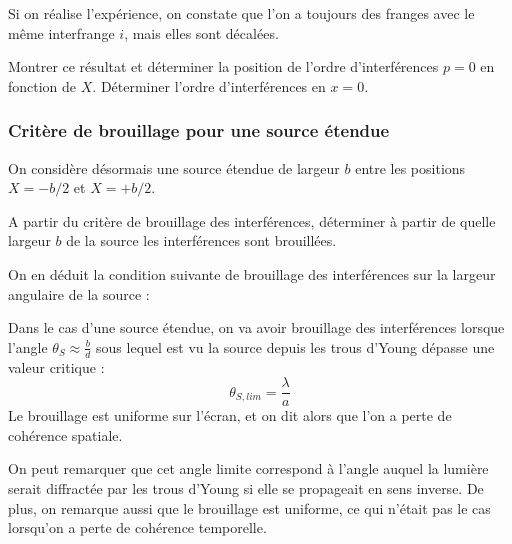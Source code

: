\documentclass[11pt,fleqn]{book} %
\begin{document}
Si on réalise l'expérience, on constate que l'on a toujours des franges avec le même interfrange $i$, mais elles sont décalées.

\begin{capex}
	Montrer ce résultat et déterminer la position de l'ordre d'interférences $p=0$ en fonction de $X$. Déterminer l'ordre d'interférences en $x=0$.
\end{capex}

\subsubsection{Critère de brouillage pour une source étendue}

On considère désormais une source étendue de largeur $b$ entre les positions $X = -b/2$ et $X = +b/2$.

\begin{capex}
	A partir du critère de brouillage des interférences, déterminer à partir de quelle largeur $b$ de la source les interférences sont brouillées.
\end{capex}

On en déduit la condition suivante de brouillage des interférences sur la largeur angulaire de la source :
\begin{proposition}
	Dans le cas d'une source étendue, on va avoir brouillage des interférences lorsque l'angle $\theta_S \approx \frac{b}{d}$ sous lequel est vu la source depuis les trous d'Young dépasse une valeur critique :
	\begin{equation}
		\theta_{S,lim} = \frac{\lambda}{a}
	\end{equation}
	Le brouillage est uniforme sur l'écran, et on dit alors que l'on a perte de cohérence spatiale.
\end{proposition}
\begin{remark}
	On peut remarquer que cet angle limite correspond à l'angle auquel la lumière serait diffractée par les trous d'Young si elle se propageait en sens inverse. De plus, on remarque aussi que le brouillage est uniforme, ce qui n'était pas le cas lorsqu'on a perte de cohérence temporelle.
\end{remark}
\end{document}
